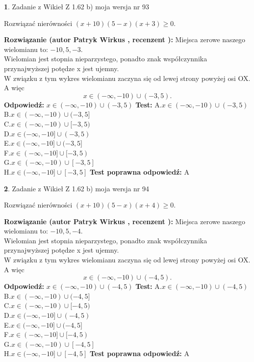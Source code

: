 \documentclass[12pt, a4paper]{article}
\theoremstyle{definition} %
\newtheorem{zad}{}
\newcommand{\zadStart}[1]{\begin{zad}#1\newline}
\newcommand{\zadStop}{\end{zad}}
\newcommand{\rozwStart}[2]{\noindent \textbf{Rozwiązanie (autor #1 , recenzent #2): }\newline}
\newcommand{\rozwStop}{\newline}
\newcommand{\odpStart}{\noindent \textbf{Odpowiedź:}\newline}
\newcommand{\odpStop}{\newline}
\newcommand{\testStart}{\noindent \textbf{Test:}\newline}
\newcommand{\testStop}{\newline}
\newcommand{\kluczStart}{\noindent \textbf{Test poprawna odpowiedź:}\newline}
\newcommand{\kluczStop}{\newline}
\begin{document}
\zadStart{Zadanie z Wikieł Z 1.62 b) moja wersja nr 93}

Rozwiązać nierówności $(x+10)(5-x)(x+3)\ge0$.
\zadStop
\rozwStart{Patryk Wirkus}{}
Miejsca zerowe naszego wielomianu to: $-10, 5, -3$.\\
Wielomian jest stopnia nieparzystego, ponadto znak współczynnika przy\linebreak najwyższej potędze x jest ujemny.\\ W związku z tym wykres wielomianu zaczyna się od lewej strony powyżej osi OX. A więc $$x \in (-\infty,-10) \cup (-3,5).$$
\rozwStop
\odpStart
$x \in (-\infty,-10) \cup (-3,5)$
\odpStop
\testStart
A.$x \in (-\infty,-10) \cup (-3,5)$\\
B.$x \in (-\infty,-10) \cup (-3,5]$\\
C.$x \in (-\infty,-10) \cup [-3,5)$\\
D.$x \in (-\infty,-10] \cup (-3,5)$\\
E.$x \in (-\infty,-10] \cup (-3,5]$\\
F.$x \in (-\infty,-10] \cup [-3,5)$\\
G.$x \in (-\infty,-10) \cup [-3,5]$\\
H.$x \in (-\infty,-10] \cup [-3,5]$
\testStop
\kluczStart
A
\kluczStop



\zadStart{Zadanie z Wikieł Z 1.62 b) moja wersja nr 94}

Rozwiązać nierówności $(x+10)(5-x)(x+4)\ge0$.
\zadStop
\rozwStart{Patryk Wirkus}{}
Miejsca zerowe naszego wielomianu to: $-10, 5, -4$.\\
Wielomian jest stopnia nieparzystego, ponadto znak współczynnika przy\linebreak najwyższej potędze x jest ujemny.\\ W związku z tym wykres wielomianu zaczyna się od lewej strony powyżej osi OX. A więc $$x \in (-\infty,-10) \cup (-4,5).$$
\rozwStop
\odpStart
$x \in (-\infty,-10) \cup (-4,5)$
\odpStop
\testStart
A.$x \in (-\infty,-10) \cup (-4,5)$\\
B.$x \in (-\infty,-10) \cup (-4,5]$\\
C.$x \in (-\infty,-10) \cup [-4,5)$\\
D.$x \in (-\infty,-10] \cup (-4,5)$\\
E.$x \in (-\infty,-10] \cup (-4,5]$\\
F.$x \in (-\infty,-10] \cup [-4,5)$\\
G.$x \in (-\infty,-10) \cup [-4,5]$\\
H.$x \in (-\infty,-10] \cup [-4,5]$
\testStop
\kluczStart
A
\kluczStop
\end{document}
